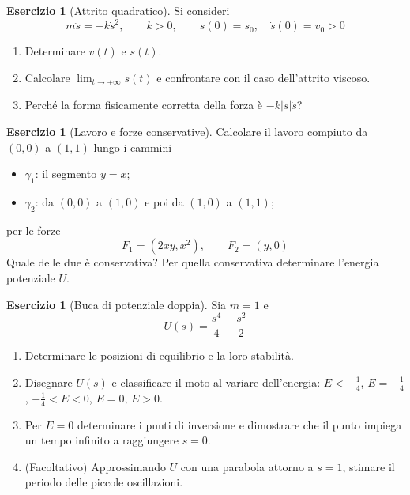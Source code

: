 \documentclass[11pt, a4paper, openright]{book}
\theoremstyle{plain}
\theoremstyle{definition}
\newtheorem{esercizio}[teorema]{Esercizio}
\theoremstyle{remark}
\begin{document}
\begin{esercizio}[Attrito quadratico]\label{es:mu4}
    Si consideri
    \begin{equation}
        m\ddot{s} = -k\dot{s}^2, \qquad k > 0, \qquad s(0) = s_0, \quad \dot{s}(0) = v_0 > 0
    \end{equation}
    \begin{enumerate}[label=(\alph*)]
        \item Determinare $v(t)$ e $s(t)$.
        \item Calcolare $\lim_{t \to +\infty} s(t)$ e confrontare con il caso dell'attrito viscoso.
        \item Perché la forma fisicamente corretta della forza è $-k|\dot{s}|\dot{s}$?
    \end{enumerate}
\end{esercizio}

\begin{esercizio}[Lavoro e forze conservative]\label{es:mu5}
    Calcolare il lavoro compiuto da $(0, 0)$ a $(1, 1)$ lungo i cammini
    \begin{itemize}
        \item $\gamma_1$: il segmento $y = x$;
        \item $\gamma_2$: da $(0, 0)$ a $(1, 0)$ e poi da $(1, 0)$ a $(1, 1)$;
    \end{itemize}
    per le forze
    \begin{equation}
        \bar{F}_1 = (2xy, x^2), \qquad \bar{F}_2 = (y, 0)
    \end{equation}
    Quale delle due è conservativa? Per quella conservativa determinare l'energia potenziale $U$.
\end{esercizio}

\begin{esercizio}[Buca di potenziale doppia]\label{es:mu6}
    Sia $m = 1$ e
    \begin{equation}
        U(s) = \frac{s^4}{4} - \frac{s^2}{2}
    \end{equation}
    \begin{enumerate}[label=(\alph*)]
        \item Determinare le posizioni di equilibrio e la loro stabilità.
        \item Disegnare $U(s)$ e classificare il moto al variare dell'energia: $E < -\frac{1}{4}$, $E = -\frac{1}{4}$, $-\frac{1}{4} < E < 0$, $E = 0$, $E > 0$.
        \item Per $E = 0$ determinare i punti di inversione e dimostrare che il punto impiega un tempo infinito a raggiungere $s = 0$.
        \item (Facoltativo) Approssimando $U$ con una parabola attorno a $s = 1$, stimare il periodo delle piccole oscillazioni.
    \end{enumerate}
\end{esercizio}
\end{document}
